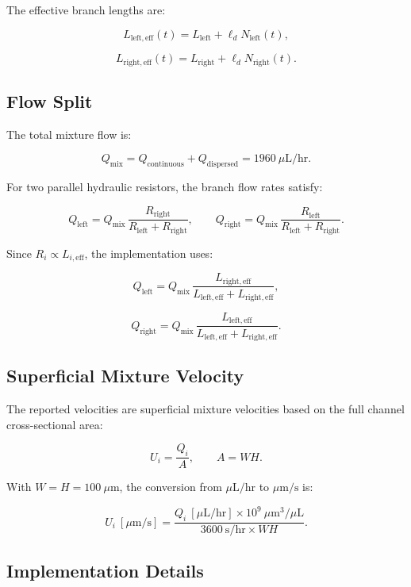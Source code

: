 The effective branch lengths are:

\[
L_{\mathrm{left,eff}}(t)
=
L_{\mathrm{left}} + \ell_d N_{\mathrm{left}}(t),
\]

\[
L_{\mathrm{right,eff}}(t)
=
L_{\mathrm{right}} + \ell_d N_{\mathrm{right}}(t).
\]

\subsection{Flow Split}

The total mixture flow is:

\[
Q_{\mathrm{mix}}
= Q_{\mathrm{continuous}} + Q_{\mathrm{dispersed}}
= 1960~\mu\mathrm{L}/\mathrm{hr}.
\]

For two parallel hydraulic resistors, the branch flow rates satisfy:

\[
Q_{\mathrm{left}}
=
Q_{\mathrm{mix}}\,
\frac{R_{\mathrm{right}}}
{R_{\mathrm{left}}+R_{\mathrm{right}}},
\qquad
Q_{\mathrm{right}}
=
Q_{\mathrm{mix}}\,
\frac{R_{\mathrm{left}}}
{R_{\mathrm{left}}+R_{\mathrm{right}}}.
\]

Since \(R_i \propto L_{i,\mathrm{eff}}\), the implementation uses:

\[
Q_{\mathrm{left}}
=
Q_{\mathrm{mix}}\,
\frac{L_{\mathrm{right,eff}}}
{L_{\mathrm{left,eff}}+L_{\mathrm{right,eff}}},
\]

\[
Q_{\mathrm{right}}
=
Q_{\mathrm{mix}}\,
\frac{L_{\mathrm{left,eff}}}
{L_{\mathrm{left,eff}}+L_{\mathrm{right,eff}}}.
\]

\subsection{Superficial Mixture Velocity}

The reported velocities are superficial mixture velocities based on the full
channel cross-sectional area:

\[
U_i
=
\frac{Q_i}{A},
\qquad
A = WH.
\]

With \(W=H=100~\mu\mathrm{m}\), the conversion from
\(\mu\mathrm{L}/\mathrm{hr}\) to \(\mu\mathrm{m}/\mathrm{s}\) is:

\[
U_i~[\mu\mathrm{m}/\mathrm{s}]
=
\frac{Q_i~[\mu\mathrm{L}/\mathrm{hr}]
\times 10^9~\mu\mathrm{m}^3/\mu\mathrm{L}}
{3600~\mathrm{s}/\mathrm{hr}\times WH}.
\]

\subsection{Implementation Details}

